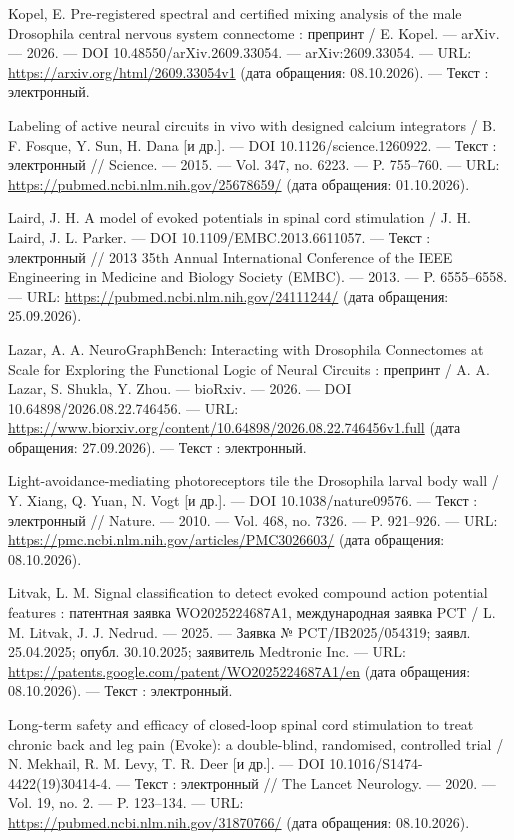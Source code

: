 \begin{list}{}{\setlength{\leftmargin}{10mm}\setlength{\labelwidth}{8mm}\setlength{\labelsep}{2mm}\setlength{\itemsep}{0pt}\setlength{\parsep}{0pt}\setlength{\topsep}{0pt}}
\item[170.] Kopel, E. Pre-registered spectral and certified mixing analysis of the male Drosophila central nervous system connectome : препринт / E. Kopel. — arXiv. — 2026. — DOI 10.48550/arXiv.2609.33054. — arXiv:2609.33054. — URL: \url{https://arxiv.org/html/2609.33054v1} (дата обращения: 08.10.2026). — Текст : электронный.
\item[171.] Labeling of active neural circuits in vivo with designed calcium integrators / B. F. Fosque, Y. Sun, H. Dana [и др.]. — DOI 10.1126/science.1260922. — Текст : электронный // Science. — 2015. — Vol. 347, no. 6223. — P. 755–760. — URL: \url{https://pubmed.ncbi.nlm.nih.gov/25678659/} (дата обращения: 01.10.2026).
\item[172.] Laird, J. H. A model of evoked potentials in spinal cord stimulation / J. H. Laird, J. L. Parker. — DOI 10.1109/EMBC.2013.6611057. — Текст : электронный // 2013 35th Annual International Conference of the IEEE Engineering in Medicine and Biology Society (EMBC). — 2013. — P. 6555–6558. — URL: \url{https://pubmed.ncbi.nlm.nih.gov/24111244/} (дата обращения: 25.09.2026).
\item[173.] Lazar, A. A. NeuroGraphBench: Interacting with Drosophila Connectomes at Scale for Exploring the Functional Logic of Neural Circuits : препринт / A. A. Lazar, S. Shukla, Y. Zhou. — bioRxiv. — 2026. — DOI 10.64898/2026.08.22.746456. — URL: \url{https://www.biorxiv.org/content/10.64898/2026.08.22.746456v1.full} (дата обращения: 27.09.2026). — Текст : электронный.
\item[174.] Light-avoidance-mediating photoreceptors tile the Drosophila larval body wall / Y. Xiang, Q. Yuan, N. Vogt [и др.]. — DOI 10.1038/nature09576. — Текст : электронный // Nature. — 2010. — Vol. 468, no. 7326. — P. 921–926. — URL: \url{https://pmc.ncbi.nlm.nih.gov/articles/PMC3026603/} (дата обращения: 08.10.2026).
\item[175.] Litvak, L. M. Signal classification to detect evoked compound action potential features : патентная заявка WO2025224687A1, международная заявка PCT / L. M. Litvak, J. J. Nedrud. — 2025. — Заявка № PCT/IB2025/054319; заявл. 25.04.2025; опубл. 30.10.2025; заявитель Medtronic Inc. — URL: \url{https://patents.google.com/patent/WO2025224687A1/en} (дата обращения: 08.10.2026). — Текст : электронный.
\item[176.] Long-term safety and efficacy of closed-loop spinal cord stimulation to treat chronic back and leg pain (Evoke): a double-blind, randomised, controlled trial / N. Mekhail, R. M. Levy, T. R. Deer [и др.]. — DOI 10.1016/S1474-4422(19)30414-4. — Текст : электронный // The Lancet Neurology. — 2020. — Vol. 19, no. 2. — P. 123–134. — URL: \url{https://pubmed.ncbi.nlm.nih.gov/31870766/} (дата обращения: 08.10.2026).

\end{list}
